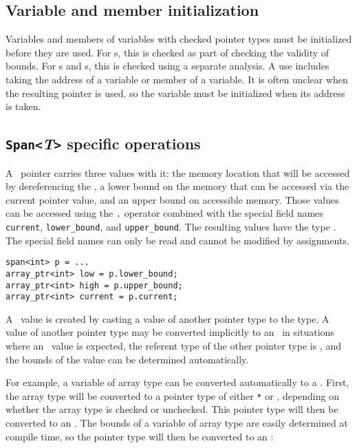 \subsection{Variable and member initialization}

Variables and members of variables with checked pointer types must be initialized
before they are used.  For \arrayptr s, this is checked as part of checking
the validity of bounds.  For \ptr s and \spanptr s, this is checked
using a separate analysis.   A use includes taking the address of a variable
or member of a variable.  It is often unclear when the resulting pointer is used,
so the variable must be initialized when its address is taken.

\subsection{\texttt{Span<}\textit{T}\texttt{>} specific operations}

A \spanptrT\
pointer carries three values with it: the memory location that will be
accessed by dereferencing the
\spanptrT, a lower
bound on the memory that can be accessed via the current pointer value,
and an upper bound on accessible memory. Those values can be accessed
using the \texttt{.} operator combined with the special field names
\texttt{current}, \texttt{lower\_bound}, and \texttt{upper\_bound}. The
resulting values have the type
\arrayptrT. The
special field names can only be read and cannot be modified by
assignments.

\begin{verbatim}
span<int> p = ...
array_ptr<int> low = p.lower_bound;
array_ptr<int> high = p.upper_bound;
array_ptr<int> current = p.current;
\end{verbatim}

A \spanptrT\ value
is created by casting a value of another pointer type to the
\spanptrT type. A
value of another pointer type may be converted implicitly to an
\spanptrT\ in
situations where an
\spanptrT\ value is
expected, the referent type of the other pointer type is , and
the bounds of the value can be determined automatically.

For example, a variable of array type can be converted automatically to
a \spanptr. First, the array type will be converted to a
pointer type of either  \texttt{*} or
\arrayptrT , depending
on whether the array type is checked or unchecked. This pointer type
will then be converted to an
\spanptrT. The
bounds of a variable of array type are easily determined at compile
time, so the pointer type will then be converted to an
\spanptrT:


